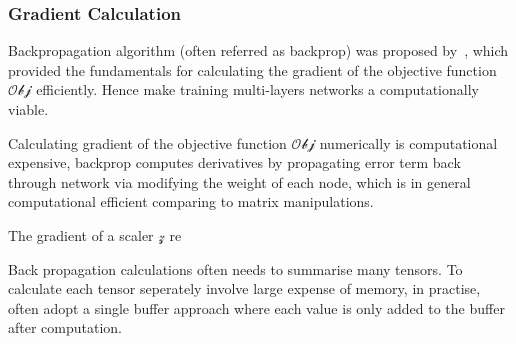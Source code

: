 \subsubsection{Gradient Calculation}
Backpropagation algorithm (often referred as backprop) was proposed by~\citet{werbos1975beyond}, which provided the fundamentals for calculating the gradient of the objective function $\mathcal{Obj}$ efficiently. Hence make training multi-layers networks a computationally viable. 
\par
Calculating gradient of the objective function $\mathcal{Obj}$ numerically is computational expensive, backprop computes derivatives by propagating error term back through network via modifying the weight of each node, which is in general computational efficient comparing to matrix manipulations. 
\par
The gradient of a scaler $\mathcal{z}$ re

Back propagation calculations often needs to summarise many tensors. To calculate each tensor seperately involve large expense of memory, in practise, often adopt a single buffer approach where each value is only added to the buffer after computation.